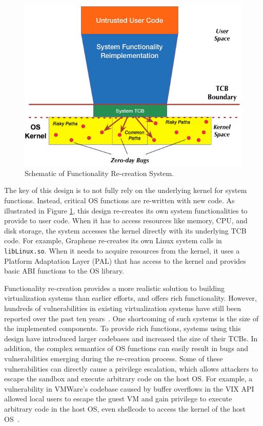\begin{figure}%
\centering
\includegraphics[width=1.0\columnwidth]{diagram/Virtualization_Design_Model_02.png}
\caption{\small Schematic of Functionality Re-creation System.}
\label{fig:design_functionality_reimplementation}
\end{figure}

The key of this design is to not fully rely on the underlying
kernel for system functions. Instead, critical OS functions are re-written with new
code. As illustrated in Figure \ref{fig:design_functionality_reimplementation},
this design re-creates its own system functionalities to provide to user code.
When it has to %
access resources like memory, CPU, and disk storage, the system accesses the kernel directly with
its underlying TCB code.
For example, Graphene \cite{Graphene-14} re-creates
its own Linux system calls in
\texttt{libLinux.so}. When it needs to acquire resources from
the kernel, it uses a
Platform Adaptation Layer (PAL)  that has access to the kernel
and provides basic ABI functions to the OS library.

Functionality re-creation provides a more realistic solution to building
virtualization systems than earlier efforts, and offers rich functionality.
However, hundreds of vulnerabilities in existing virtualization systems have still been
reported over the past ten years~\cite{NVD}. One shortcoming of such systems is the size
of the implemented components. To provide rich functions, systems using this design have
introduced larger codebases and increased the size of their TCBs. In addition, the
complex semantics of OS functions can easily result in bugs and vulnerabilities
emerging during the re-creation process. Some of these vulnerabilities
can directly cause a privilege escalation, which allows attackers to escape the sandbox
and execute arbitrary code on the host OS.
For example, a vulnerability in VMWare's codebase caused by buffer overflows in the VIX
API allowed local users to escape the guest VM and
gain privilege to execute arbitrary code in the host
OS, even shellcode to access the kernel of the host OS~\cite{CVE-2008-2100}.

